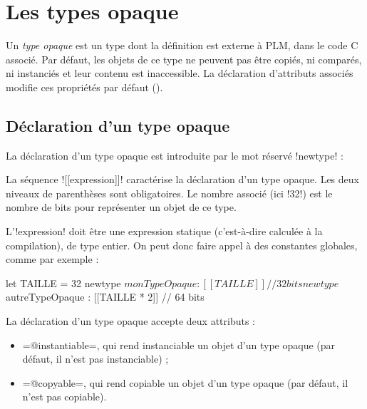 




\chapter{Les types opaque}

Un \emph{type opaque} est un type dont la définition est externe à PLM, dans le code C associé. Par défaut, les objets de ce type ne peuvent pas être copiés, ni comparés, ni instanciés et leur contenu est inaccessible. La déclaration d'attributs associés modifie ces propriétés par défaut ().

\section{Déclaration d'un type opaque}

La déclaration d'un type opaque est introduite par le mot réservé \plm!newtype! :


La séquence \plm![[expression]]! caractérise la déclaration d'un type opaque. Les deux niveaux de parenthèses sont obligatoires. Le nombre associé (ici \plm!32!) est le nombre de bits pour représenter un objet de ce type.

L'\plm!expression! doit être une expression statique (c'est-à-dire calculée à la compilation), de type entier. On peut donc faire appel à des constantes globales, comme par exemple :

\begin{PLM}
let TAILLE = 32
newtype $monTypeOpaque : [[TAILLE]] // 32 bits
newtype $autreTypeOpaque : [[TAILLE * 2]] // 64 bits
\end{PLM}






La déclaration d'un type opaque accepte deux attributs :
\begin{itemize}
\item \plm=@instantiable=, qui rend instanciable un objet d'un type opaque (par défaut, il n'est pas instanciable) ;
\item \plm=@copyable=, qui rend copiable un objet d'un type opaque (par défaut, il n'est pas copiable).
\end{itemize}

